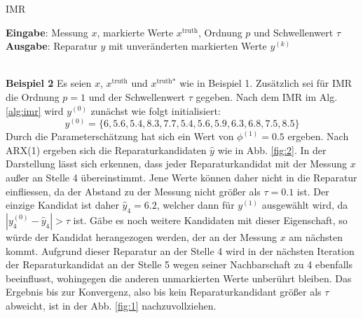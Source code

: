 \begin{algorithm}
\caption{IMR}
\label{alg:imr}
    \begin{algorithmic}[1]
\STATE \textbf{Eingabe}: Messung $x$, markierte Werte $x^{\text{truth}}$, Ordnung $p$ und Schwellenwert $\tau$
\STATE \textbf{Ausgabe}: Reparatur $y$ mit unveränderten markierten Werte 
        \ENDIF
 \ENDFOR
    \RETURN $y^{(k)}$
\end{algorithmic}
\end{algorithm}
~\\
\textbf{Beispiel 2} Es seien $x$, $x^{\text{truth}}$ und $x^{\text{truth}*}$ wie in Beispiel 1. Zusätzlich sei für IMR die Ordnung $p=1$ und der Schwellenwert $\tau$ gegeben.
Nach dem IMR im Alg. \ref{alg:imr} wird $y^{(0)}$ zunächst wie folgt initialisiert: 
\[
     y^{(0)} =          \{6, 5.6, 5.4, 8.3, 7.7, 5.4, 5.6, 5.9, 6.3, 6.8, 7.5, 8.5\}
\]
Durch die Parameterschätzung hat sich ein Wert von $\phi^{(1)} = 0.5$ ergeben.
Nach ARX(1) ergeben sich die Reparaturkandidaten $\hat{y}$ wie in Abb.
\ref{fig:2}.  In der Darstellung lässt sich erkennen, dass jeder
Reparaturkandidat mit der Messung $x$ außer an Stelle 4 übereinstimmt. Jene
Werte können daher nicht in die Reparatur einfliessen, da der Abstand zu der
Messung nicht größer als $\tau = 0.1$ ist. Der einzige Kandidat ist daher
$\hat{y}_4 = 6.2$, welcher dann für $y^{(1)}$ ausgewählt wird, da $|y^{(0)}_4 -
\hat{y}_4| > \tau$ ist. Gäbe es noch weitere Kandidaten mit dieser Eigenschaft,
so würde der Kandidat herangezogen werden, der an der Messung $x$ am nächsten kommt.
Aufgrund dieser Reparatur an der Stelle 4 wird in der nächsten Iteration der
Reparaturkandidat an der Stelle 5 wegen seiner Nachbarschaft zu 4 ebenfalls
beeinflusst, wohingegen die anderen unmarkierten Werte unberührt bleiben. Das
Ergebnis bis zur Konvergenz, also bis kein Reparaturkandidant größer als $\tau$
abweicht, ist in der Abb. \ref{fig:1} nachzuvollziehen.

